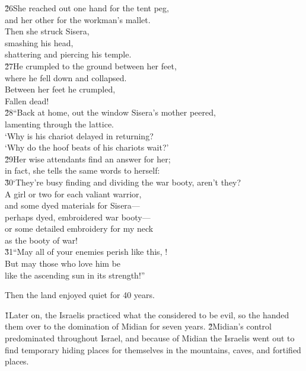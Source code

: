 \begin{poetry}
\poeml \v{26}She reached out one hand for the tent peg, \\
\poemll    and her other for the workman's mallet. \\
\poeml Then she struck Sisera, \\
\poemll    smashing his head, \\
\poemlll       shattering and piercing his temple. \\
\poeml \v{27}He crumpled to the ground between her feet, \\
\poemll    where he fell down and collapsed. \\
\poeml Between her feet he crumpled, \\
\poemll    Fallen dead! \\
\poeml \v{28}``Back at home, out the window Sisera's mother peered, \\
\poemll    lamenting through the lattice. \\
\poeml `Why is his chariot delayed in returning? \\
\poemll    `Why do the hoof beats of his chariots wait?' \\
\poeml \v{29}Her wise attendants find an answer for her; \\
\poemll    in fact, she tells the same words to herself: \\
\poeml \v{30}`They're busy finding and dividing the war booty, aren't they? \\
\poemll    A girl or two for each valiant warrior, \\
\poeml and some dyed materials for Sisera--- \\
\poemll    perhaps dyed, embroidered war booty--- \\
\poeml or some detailed embroidery for my neck \\
\poemll    as the booty of war! \\
\poeml \v{31}``May all of your enemies perish like this, ! \\
\poemll    But may those who love him be \\
\poemlll       like the ascending sun in its strength!''
\end{poetry}

Then the land enjoyed quiet for 40 years.

\v{1}Later on, the Israelis practiced what the  considered to be evil, so the  handed them over to the domination of Midian for seven years. \v{2}Midian's control predominated throughout Israel, and because of Midian the Israelis went out to find temporary hiding places for themselves in the mountains, caves, and fortified places.

